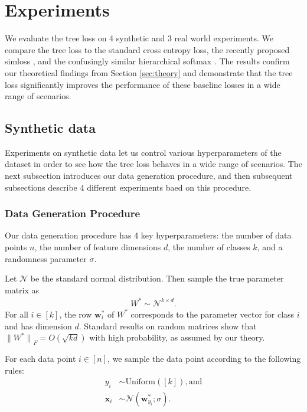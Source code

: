 \documentclass[twoside]{article}
\renewcommand{\star}[1]{{#1}^{*}}
\newcommand{\w}{\mathbf w}
\newcommand{\x}{\mathbf x}
\newcommand{\lF}[1]{{\lVert {#1} \rVert}_F}
\begin{document}
\section{Experiments}
\label{sec:experiment}

We evaluate the tree loss on 4 synthetic and 3 real world experiments.
We compare the tree loss to the standard cross entropy loss, the recently proposed simloss \citep{Kobs2020SimLossCS}, and the confusingly similar hierarchical softmax \citep{morin2005hierarchical}.
The results confirm our theoretical findings from Section \ref{sec:theory} and demonstrate that the tree loss significantly improves the performance of these baseline losses in a wide range of scenarios.

\subsection{Synthetic data}

Experiments on synthetic data let us control various hyperparameters of the dataset in order to see how the tree loss behaves in a wide range of scenarios.
The next subsection introduces our data generation procedure,
and then subsequent subsections describe 4 different experiments baed on this procedure.

\subsubsection{Data Generation Procedure}
\label{sec:exp:synth:problem}

Our data generation procedure has 4 key hyperparameters:
the number of data points $n$, the number of feature dimensions $d$, the number of classes $k$, and a randomness parameter $\sigma$.

Let $\mathcal N$ be the standard normal distribution.
Then sample the true parameter matrix as
\begin{align}
    \star W \sim \mathcal N^{k\times d}
    .
\end{align}
For all $i \in [k]$, the row $\w_i^*$ of $W^*$ corresponds to the parameter vector for class $i$ and has dimension $d$.
Standard results on random matrices show that $\lF{\star W} = O(\sqrt{kd})$ with high probability, as assumed by our theory.

For each data point $i\in[n]$,
we sample the data point according to the following rules:
\begin{align}
    y_i &\sim \text{Uniform}([k]), \text{and} \\
    \x_{i} &\sim \mathcal N(\w^*_{y_i}; \sigma).
\end{align}
\end{document}

